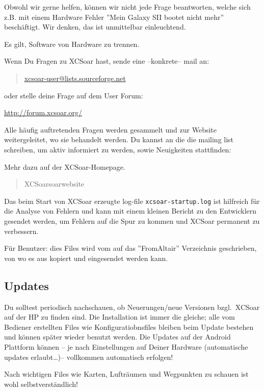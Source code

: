 Obwohl wir gerne helfen, können wir nicht jede Frage beantworten, welche sich z.B. mit einem 
Hardware Fehler ''Mein  Galaxy SII bootet nicht mehr'' beschäftigt. Wir denken, das ist unmittelbar einleuchtend.

Es gilt, Software von Hardware zu trennen. 

Wenn Du Fragen zu \textsf{XCSoar} hast, sende eine --konkrete-- mail an: 

\begin{quote}
\url{xcsoar-user@lists.sourceforge.net}
\end{quote}
oder stelle deine Frage auf dem User Forum:
\begin{center}
\url{http://forum.xcsoar.org/}
\end{center}

Alle häufig auftretenden Fragen werden gesammelt und zur Website weitergeleitet, wo sie behandelt werden.
Du kannst an die die mailing list schreiben, um aktiv informiert zu werden, sowie Neuigkeiten stattfinden: 

Mehr dazu auf der \textsf{XCSoar}-Homepage. 

\begin{quote}
\textsf{XCSoar}soarwebsite
\end{quote}

Das beim Start von \textsf{XCSoar} erzeugte log-file \verb|xcsoar-startup.log| ist hilfreich für die Analyse von Fehlern und kann  
mit einem kleinen Bericht zu den Entwicklern gesendet werden, um Fehlern auf die Spur zu kommen 
und \textsf{XCSoar} permanent zu verbessern. 

Für \al Benutzer: dies Files wird vom \al auf das ''FromAltair'' Verzeichnis geschrieben, von wo es aus kopiert 
und eingesendet werden kann. 

\subsection*{Updates}
Du solltest periodisch nachschauen, ob Neuerungen/neue Versionen  bzgl.\ \textsf{XCSoar} auf der HP zu finden sind. 
Die Installation ist immer die gleiche; alle vom Bediener erstellten Files wie Konfiguratiobnsfiles 
bleiben beim Update bestehen und können später wieder benutzt werden. Die Updates auf der Android Plattform können -- je nach Einstellungen auf Deiner Hardware  (automatische updates erlaubt\dots)-- vollkommen automatisch erfolgen! 

Nach wichtigen Files wie Karten, Lufträumen und Wegpunkten zu schauen ist wohl selbstverständlich!


